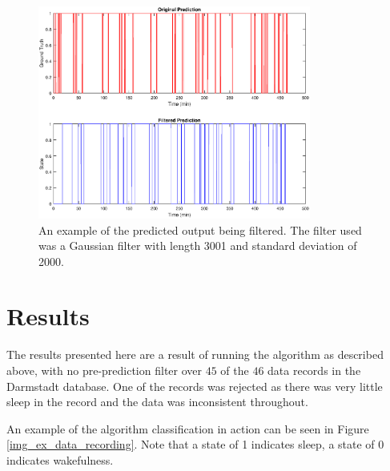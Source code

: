             \begin{figure}[h]
                \includegraphics[width=0.8\textwidth]{Images/post_prediction_filters_ex.eps}
                \centering
                \caption{An example of the predicted output being filtered. The filter used was a Gaussian filter with length 3001 and standard deviation of 2000.}
                \label{img_post_filter_ex}
            \end{figure}


    \chapter{Results}

        The results presented here are a result of running the algorithm as described above, with no pre-prediction filter over $45$ of the $46$ data records in the Darmstadt database. One of the records was rejected as there was very little sleep in the record and the data was inconsistent throughout.

        An example of the algorithm classification in action can be seen in Figure \ref{img_ex_data_recording}. Note that a state of 1 indicates sleep, a state of 0 indicates wakefulness. 

